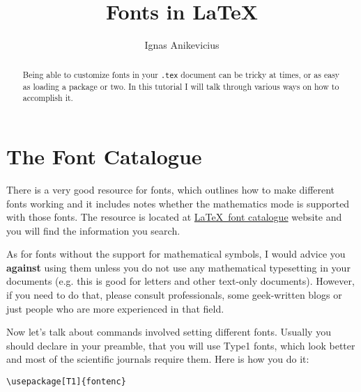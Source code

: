 


\def\reflect#1{{\setbox0=\hbox{#1}\rlap{\kern0.5\wd0
  \special{x:gsave}\special{x:scale -1 1}}\box0 \special{x:grestore}}}
\def\XeTeX{\leavevmode
  \setbox0=\hbox{X\lower.5ex\hbox{\kern-.15em\reflect{E}}\kern-.1667em \TeX}%
  \dp0=0pt\ht0=0pt\box0 }

\title{Fonts in \LaTeX{}}
\author{Ignas Anikevicius}



\maketitle

\begin{abstract}
    Being able to customize fonts in your \verb|.tex| document can be tricky at
    times, or as easy as loading a package or two. In this tutorial I will talk
    through various ways on how to accomplish it.
\end{abstract}

\tableofcontents

\section{The Font Catalogue}

There is a very good resource for fonts, which outlines how to make different
fonts working and it includes notes whether the mathematics mode is supported
with those fonts. The resource is located at
\href{http://www.tug.dk/FontCatalogue/}{\LaTeX\ font catalogue} website and you
will find the information you search.

As for fonts without the support for mathematical symbols, I would advice you
\textbf{against} using them unless you do not use any mathematical  typesetting
in your documents (e.g. this is good for letters and other text-only documents).
However, if you need to do that, please consult professionals, some geek-written
blogs or just people who are more experienced in that field.

Now let's talk about commands involved setting different fonts. Usually you
should declare in your preamble, that you will use Type1 fonts, which look
better and most of the scientific journals require them. Here is how you do it:
\begin{lstlisting}
\usepackage[T1]{fontenc}
\end{lstlisting}

